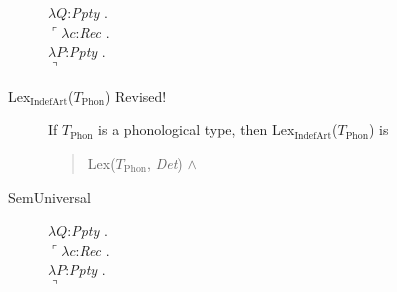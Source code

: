 \begin{description}

  $\lambda Q$:\textit{Ppty} . \\
  \hspace*{1em}$\ulcorner\lambda c$:\textit{Rec} . \\
  \hspace*{2em}$\lambda P$:\textit{Ppty} . \\
  \hspace*{3em}$\urcorner$

        
      \item[\textnormal{Lex$_{\mathrm{IndefArt}}$($T_{\mathrm{Phon}}$)}
        Revised!]
        \mbox{}

        If $T_{\mathrm{Phon}}$ is a phonological type, then
        Lex$_{\mathrm{IndefArt}}$($T_{\mathrm{Phon}}$) is
        \begin{quote}
          Lex($T_{\mathrm{Phon}}$, \textit{Det}) \d{$\wedge$}
        \end{quote}

        
      \item[\textnormal{SemUniversal}] \mbox{}

        $\lambda Q$:\textit{Ppty} . \\
  \hspace*{1em}$\ulcorner\lambda c$:\textit{Rec} . \\
  \hspace*{2em}$\lambda P$:\textit{Ppty} . \\
  \hspace*{3em}$\urcorner$


\end{description}
